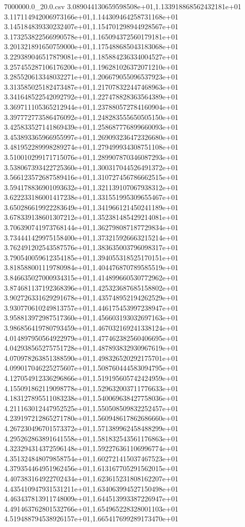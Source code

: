 \begin{filecontents*}{7000000.0_20.0.csv}
3.089044130659598508e+01,1.133918868562432181e+01
3.117114942006973166e+01,1.144309464258731168e+01
3.145184839330232407e+01,1.154701298944928567e+01
3.173253822566990578e+01,1.165094372560179181e+01
3.201321891650759000e+01,1.175488685043183068e+01
3.229389046517879081e+01,1.185884236334004527e+01
3.257455287106176200e+01,1.196281026372071210e+01
3.285520613348032271e+01,1.206679055096537923e+01
3.313585025182473487e+01,1.217078322447468963e+01
3.341648522542092792e+01,1.227478828363564389e+01
3.369711105365212944e+01,1.237880572784160904e+01
3.397772773586476092e+01,1.248283555650505150e+01
3.425833527141869439e+01,1.258687776899660093e+01
3.453893365966955997e+01,1.269093236472326680e+01
3.481952289998289274e+01,1.279499934308751108e+01
3.510010299171715076e+01,1.289907870346087293e+01
3.538067393422725360e+01,1.300317044526491372e+01
3.566123572687589416e+01,1.310727456786662515e+01
3.594178836901093632e+01,1.321139107067938312e+01
3.622233186001417238e+01,1.331551995309655467e+01
3.650286619922283649e+01,1.341966121450241189e+01
3.678339138601307212e+01,1.352381485429214081e+01
3.706390741973768144e+01,1.362798087187729834e+01
3.734441429975158400e+01,1.373215926663215214e+01
3.762491202543587576e+01,1.383635003796098317e+01
3.790540059612354185e+01,1.394055318525170151e+01
3.818588001119780984e+01,1.404476870789585519e+01
3.846635027000934315e+01,1.414899660530772962e+01
3.874681137192368396e+01,1.425323687685158802e+01
3.902726331629291678e+01,1.435748952194262529e+01
3.930770610249813757e+01,1.446175453997238947e+01
3.958813972987517360e+01,1.456603193032697163e+01
3.986856419780793459e+01,1.467032169241338124e+01
4.014897950564922979e+01,1.477462382560406695e+01
4.042938565275751728e+01,1.487893832930967619e+01
4.070978263851388590e+01,1.498326520292175701e+01
4.099017046225275607e+01,1.508760444583094795e+01
4.127054912336296866e+01,1.519195605742424959e+01
4.155091862119098778e+01,1.529632003711776633e+01
4.183127895511083238e+01,1.540069638427758036e+01
4.211163012447952525e+01,1.550508509832252457e+01
4.239197212865271780e+01,1.560948617862686660e+01
4.267230496701573372e+01,1.571389962458488299e+01
4.295262863891641558e+01,1.581832543561176863e+01
4.323294314372596148e+01,1.592276361106996774e+01
4.351324848079858754e+01,1.602721415037467523e+01
4.379354464951962456e+01,1.613167705291562015e+01
4.407383164922702434e+01,1.623615231808162207e+01
4.435410947931531211e+01,1.634063994527150498e+01
4.463437813911748009e+01,1.644513993387226947e+01
4.491463762801532766e+01,1.654965228328001103e+01
4.519488794538926157e+01,1.665417699289173470e+01

\end{filecontents*}
